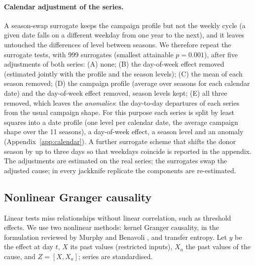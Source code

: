 \documentclass[11pt,a4paper]{article}
\begin{document}
\paragraph{Calendar adjustment of the series.} A season-swap surrogate keeps the campaign profile but not the weekly cycle (a given date falls on a different weekday from one year to the next), and it leaves untouched the differences of level between seasons. We therefore repeat the surrogate tests, with 999 surrogates (smallest attainable $p=0.001$), after five adjustments of both series: (A) none; (B) the day-of-week effect removed (estimated jointly with the profile and the season levels); (C) the mean of each season removed; (D) the campaign profile (average over seasons for each calendar date) and the day-of-week effect removed, season levels kept; (E) all three removed, which leaves the \emph{anomalies}: the day-to-day departures of each series from the usual campaign shape. For this purpose each series is split by least squares into a date profile (one level per calendar date, the average campaign shape over the 11 seasons), a day-of-week effect, a season level and an anomaly (Appendix~\ref{app:calendar}). A further surrogate scheme that shifts the donor season by up to three days so that weekdays coincide is reported in the appendix. The adjustments are estimated on the real series; the surrogates swap the adjusted cause; in every jackknife replicate the components are re-estimated.

\subsection{Nonlinear Granger causality}\label{sec:nonlinear}
Linear tests miss relationships without linear correlation, such as threshold effects. We use two nonlinear methods: kernel Granger causality, in the formulation reviewed by Murphy and Benavoli \cite{murphy2026}, and transfer entropy. Let $y$ be the effect at day $t$, $X$ its past values (restricted inputs), $X_a$ the past values of the cause, and $Z=[X,X_a]$; series are standardised.
\end{document}
